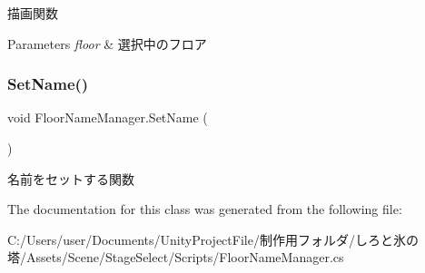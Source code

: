 描画関数 


\begin{DoxyParams}{Parameters}
{\em floor} & 選択中のフロア\\
\hline
\end{DoxyParams}
\mbox{\label{class_floor_name_manager_a3e0fb0fce8e686a9bde048d606bbb2e4}} 
\subsubsection{\texorpdfstring{Set\+Name()}{SetName()}}
{\footnotesize\ttfamily void Floor\+Name\+Manager.\+Set\+Name (\begin{DoxyParamCaption}{ }\end{DoxyParamCaption})\hspace{0.3cm}{\ttfamily [inline]}}



名前をセットする関数 



The documentation for this class was generated from the following file\+:\begin{DoxyCompactItemize}
\item 
C\+:/\+Users/user/\+Documents/\+Unity\+Project\+File/制作用フォルダ/しろと氷の塔/\+Assets/\+Scene/\+Stage\+Select/\+Scripts/Floor\+Name\+Manager.\+cs\end{DoxyCompactItemize}
